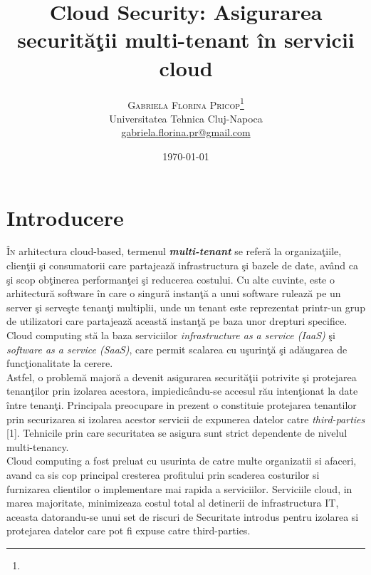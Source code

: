 \documentclass[twoside,twocolumn]{article}
\title{Cloud Security: Asigurarea securit\u{a}\c{t}ii multi-tenant \^{i}n servicii cloud} %
\author{%
\textsc{Gabriela Florina Pricop}\thanks{} \\[1ex] %
\normalsize Universitatea Tehnica Cluj-Napoca \\ %
\normalsize \href{mailto:gabriela.florina.pr@gmail.com}{gabriela.florina.pr@gmail.com} %
}
\date{\today} %
\begin{document}
\maketitle


\section{Introducere}

\lettrine[nindent=0em,lines=3]{\^{I}}n arhitectura cloud-based, termenul \textit{\textbf{multi-tenant}} se refer\u{a} la organiza\c{t}iile, clien\c{t}ii \c{s}i consumatorii care partajeaz\u{a} infrastructura \c{s}i bazele de date, av\^{a}nd ca \c{s}i scop ob\c{t}inerea performan\c{t}ei \c{s}i reducerea costului. Cu alte cuvinte, este o arhitectur\u{a} software \^{i}n care o singur\u{a} instan\c{t}\u{a} a unui software ruleaz\u{a} pe un server \c{s}i serve\c{s}te tenan\c{t}i multiplii, unde un tenant este reprezentat printr-un grup de utilizatori care partajeaz\u{a} aceast\u{a} instan\c{t}\u{a} pe baza unor drepturi specifice. \\

 Cloud computing st\u{a} la baza serviciilor \textit{infrastructure as a service (IaaS)} \c{s}i \textit{software as a service (SaaS)}, care permit scalarea cu u\c{s}urin\c{t}\u{a} \c{s}i ad\u{a}ugarea de func\c{t}ionalitate la cerere. \\

Astfel, o problem\u{a} major\u{a} a devenit asigurarea securit\u{a}\c{t}ii potrivite \c{s}i protejarea tenan\c{t}ilor prin izolarea acestora, impiedic\^{a}ndu-se accesul r\u{a}u inten\c{t}ionat la date \^{i}ntre tenan\c{t}i. Principala preocupare in prezent o constituie protejarea tenantilor prin securizarea si izolarea acestor servicii de expunerea datelor catre \textit{third-parties} [1]. Tehnicile prin care securitatea se asigura sunt strict dependente de nivelul multi-tenancy.\\

Cloud computing a fost preluat cu usurinta de catre multe organizatii si afaceri, avand ca sis cop principal cresterea profitului prin scaderea costurilor si furnizarea clientilor o implementare mai rapida a serviciilor. Serviciile cloud, in marea majoritate,  minimizeaza costul total al detinerii de infrastructura IT, aceasta datorandu-se unui set de riscuri de Securitate introdus pentru izolarea si protejarea datelor care pot fi expuse catre third-parties.  \\
\end{document}
